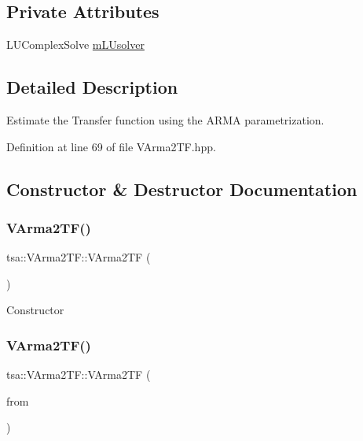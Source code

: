 \subsection*{Private Attributes}
\begin{DoxyCompactItemize}
\item 
L\+U\+Complex\+Solve \hyperlink{classtsa_1_1_v_arma2_t_f_a140ef6079dc2bc152a9a8b220c278fd8}{m\+L\+Usolver}
\end{DoxyCompactItemize}


\subsection{Detailed Description}
Estimate the Transfer function using the A\+R\+MA parametrization. 

Definition at line 69 of file V\+Arma2\+T\+F.\+hpp.



\subsection{Constructor \& Destructor Documentation}
\mbox{\label{classtsa_1_1_v_arma2_t_f_a70dbd25e305c6dc002b56994e249fb7e}} 
\subsubsection{\texorpdfstring{V\+Arma2\+T\+F()}{VArma2TF()}\hspace{0.1cm}{\footnotesize\ttfamily [1/2]}}
{\footnotesize\ttfamily tsa\+::\+V\+Arma2\+T\+F\+::\+V\+Arma2\+TF (\begin{DoxyParamCaption}{ }\end{DoxyParamCaption})}

Constructor \mbox{\label{classtsa_1_1_v_arma2_t_f_acb49999f01a40c655b7a29aac47024fc}} 
\subsubsection{\texorpdfstring{V\+Arma2\+T\+F()}{VArma2TF()}\hspace{0.1cm}{\footnotesize\ttfamily [2/2]}}
{\footnotesize\ttfamily tsa\+::\+V\+Arma2\+T\+F\+::\+V\+Arma2\+TF (\begin{DoxyParamCaption}\item[{const \hyperlink{classtsa_1_1_v_arma2_t_f}{V\+Arma2\+TF} \&}]{from }\end{DoxyParamCaption})}

